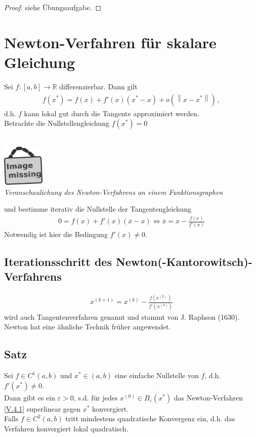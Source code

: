 \documentclass[ngerman,fontsize=11pt, paper=a4, parskip=half, titlepage=true, toc=bib]{scrbook}
\newcommand{\R}{\mathds{R}}
\newcommand{\nn}[1]{\left\| #1 \right\|}
\newcommand{\sectione}[1]{\section{#1} \setcounter{equation}{0}}
\newcommand{\imagemissing}[1]{
  \begin{center}~\\
    \centering 
    \includegraphics[width=2cm]{images/image_missing.jpg}\\
    \textit{#1} \\
  \end{center}
}
\begin{document}
  \begin{proof}
    siehe Übungsaufgabe.
  \end{proof}
  
  \sectione{Newton-Verfahren für skalare Gleichung} 
  Sei $f:[a,b]\longrightarrow \R$ differenzierbar. Dann gilt
  \begin{gather*}
    f(x^{*}) = f(x) + f'(x)(x^{*}-x)+o(\nn{x-x^{*}}) \, ,
  \end{gather*} 
  d.h. $f$ kann lokal gut durch die Tangente approximiert werden. \\
  Betrachte die Nullstellengleichung $f(x^{*}) = 0$ \\
  \imagemissing{Veranschaulichung des Newton-Verfahrens an einem Funktionsgraphen}
  und bestimme iterativ die Nullstelle der Tangentengleichung
  \begin{gather*}
    0=f(x) + f'(x)(\overline{x}-x) \Leftrightarrow \overline{x}= x-\frac{f(x)}{f'(x)}
  \end{gather*}
  Notwendig ist hier die Bedingung $f'(x) \neq 0$.
  
  
  \subsection{Iterationsschritt des Newton(-Kantorowitsch)-Verfahrens}
  \begin{gather}
    x^{(k+1)} = x^{(k)} - \frac{f(x^{(k)})}{f'(x^{(k)})}
    \label{V.4.1}
  \end{gather}
  wird auch Tangentenverfahren genannt und stammt von
  J. Raphson (1630). Newton hat eine ähnliche Technik früher angewendet.
  
  \subsection{Satz}\label{5.4.2}
  Sei $f\in C^1(a,b)$ und $x^{*}\in (a,b)$ eine einfache Nullstelle von $f$, d.h. $f'(x^{*})\neq 0$. \\
  Dann gibt es ein  $\varepsilon >0$, s.d. für jedes $x^{(0)}\in\overline{B_\varepsilon(x^{*})}$
  das Newton-Verfahren \eqref{V.4.1} superlinear gegen $x^{*}$ konvergiert.\\
  Falls $f\in C^2(a,b) $ tritt mindestens quadratische Konvergenz ein, d.h. das Verfahren
  konvergiert lokal quadratisch.
  
\end{document}
